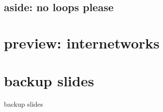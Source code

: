 




\subsection{aside: no loops please}



\section{preview: internetworks}



\section{backup slides}
\begin{frame}{backup slides}
\end{frame}


